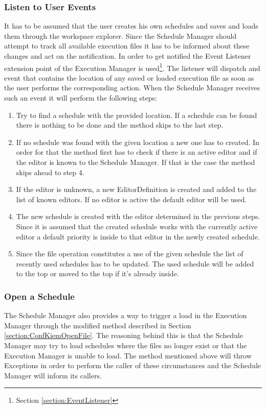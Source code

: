 \subsubsection{Listen to User Events}
\label{section:UserEvents}
It has to be assumed that the user creates his own schedules and saves and loads them through the workspace explorer.
Since the Schedule Manager should attempt to track all available execution files it has to be informed about
these changes and act on the notification. In order to get notified the Event Listener extension point
of the Execution Manager is used\footnote{Section \ref{section:EventListener}}. The listener will dispatch and event
that contains the location of any saved or loaded execution file as soon as the user performs the corresponding action.
When the Schedule Manager receives such an event it will perform the following steps:
\begin{enumerate}
 \item Try to find a schedule with the provided location. If a schedule can be found there is nothing to be
done and the method skips to the last step.
 \item If no schedule was found with the given location a new one has to created. In order for that the method
first has to check if there is an active editor and if the editor is known to the Schedule Manager. If that is
the case the method skips ahead to step 4.
 \item If the editor is unknown, a new EditorDefinition is created and added to the list of known editors.
If no editor is active the default editor will be used.
 \item The new schedule is created with the editor determined in the previous steps. Since it is assumed that
the created schedule works with the currently active editor a default priority is inside to that editor in the
newly created schedule.
 \item Since the file operation constitutes a use of the given schedule the list of recently used schedules has
to be updated. The used schedule will be added to the top or moved to the top if it's already inside.
\end{enumerate}


\subsubsection{Open a Schedule}
\label{section:OpenSchedule}
The Schedule Manager also provides a way to trigger a load in the Execution Manager through the modified 
method described in Section \ref{section:ConfKiemOpenFile}. The reasoning behind this
is that the Schedule Manager may try to load schedules where the files no longer exist or that the 
Execution Manager is unable to load. The method mentioned above will throw Exceptions in order to perform
the caller of these circumstances and the Schedule Manager will inform its callers.

